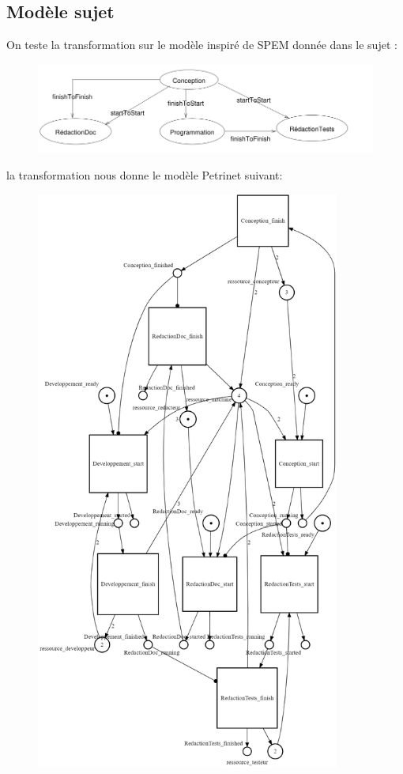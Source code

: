 \documentclass{article}
\begin{document}
\subsection{Modèle sujet}
On teste la transformation sur le modèle inspiré de SPEM donnée dans le sujet :
\begin{figure}[H]
    \centering
    \includegraphics[width = 15cm]{pdl-sujet.png}
\end{figure}
la transformation nous donne le modèle Petrinet suivant:
\begin{figure}[H]
    \centering
    \includegraphics[width = 10cm]{net-sujet.png}
\end{figure}
\end{document}
